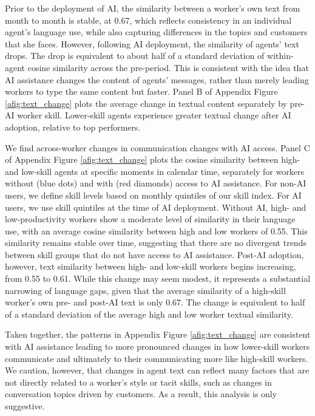 \documentclass[11pt]{article}
\begin{document}
Prior to the deployment of AI, the similarity between a worker's own text from month to month is stable, at 0.67, which reflects consistency in an individual agent's language use, while also capturing differences in the topics and customers that she faces.  However, following AI deployment, the similarity of agents' text drops. The drop is equivalent to about half of a standard deviation of within-agent cosine similarity across the pre-period. This is consistent with the idea that AI assistance changes the content of agents' messages, rather than merely leading workers to type the same content but faster.  Panel B of Appendix Figure \ref{afig:text_change} plots the average change in textual content separately by pre-AI worker skill. Lower-skill agents experience greater textual change after AI adoption, relative to top performers. 

We find across-worker changes in communication changes with AI access.  Panel C of Appendix Figure \ref{afig:text_change} plots the cosine similarity between high- and low-skill agents at specific moments in calendar time, separately for workers without (blue dots) and with (red diamonds) access to AI assistance. For non-AI users, we define skill levels based on monthly quintiles of our skill index. For AI users, we use skill quintiles at the time of AI deployment.  Without AI, high- and low-productivity workers show a moderate level of similarity in their language use, with an average cosine similarity between high and low workers of 0.55.  This similarity remains stable over time, suggesting that there are no divergent trends between skill groups that do not have access to AI assistance.  Post-AI adoption, however, text similarity between high- and low-skill workers begins increasing, from 0.55 to 0.61. While this change may seem modest, it represents a substantial narrowing of language gaps, given that the average similarity of a high-skill worker's own pre- and post-AI text is only 0.67. The change is equivalent to half of a standard deviation of the average high and low worker textual similarity.  

Taken together, the patterns in Appendix Figure \ref{afig:text_change} are consistent with AI assistance leading to more pronounced changes in how lower-skill workers communicate and  ultimately to their communicating more like high-skill workers. We caution, however, that changes in agent text can reflect many factors that are not directly related to a worker's style or tacit skills, such as changes in conversation topics driven by customers.  As a result, this analysis is only suggestive. 
\end{document}
